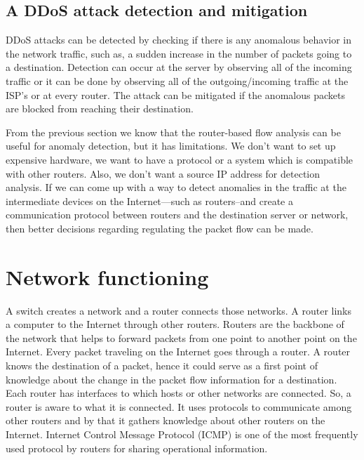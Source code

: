 \documentclass[12pt,oneside,a4paper]{article}
\begin{document}
\subsection{A DDoS attack detection and mitigation}

DDoS attacks can be detected by checking if there is any anomalous behavior in the network traffic, such as, a sudden increase in the number of packets going to a destination. Detection can occur at the server by observing all of the incoming traffic or it can be done by observing all of the outgoing/incoming traffic at the ISP's or at every router. The attack can be mitigated if the anomalous packets are blocked from reaching their destination.

From the previous section we know that the router-based flow analysis can be useful for anomaly detection, but it has limitations. We don't want to set up expensive hardware, we want to have a protocol or a system which is compatible with other routers. Also, we don't want a source IP address for detection analysis. If we can come up with a way to detect anomalies in the traffic at the intermediate devices on the Internet---such as routers--and create a communication protocol between routers and the destination server or network, then better decisions regarding regulating the packet flow can be made.

\pagebreak
\section{Network functioning}

A switch creates a network and a router connects those networks. A router links a computer to the Internet through other routers. Routers are the backbone of the network that helps to forward packets from one point to another point on the Internet. Every packet traveling on the Internet goes through a router\cite{router-switch}. A router knows the destination of a packet, hence it could serve as a first point of knowledge about the change in the packet flow information for a destination. Each router has interfaces to which hosts or other networks are connected. So, a router is aware to what it is connected. It uses protocols to communicate among other routers and by that it gathers knowledge about other routers on the Internet.  Internet Control Message Protocol (ICMP)\cite{icmp} is one of the most frequently used protocol by routers for sharing operational information.\par
\end{document}
